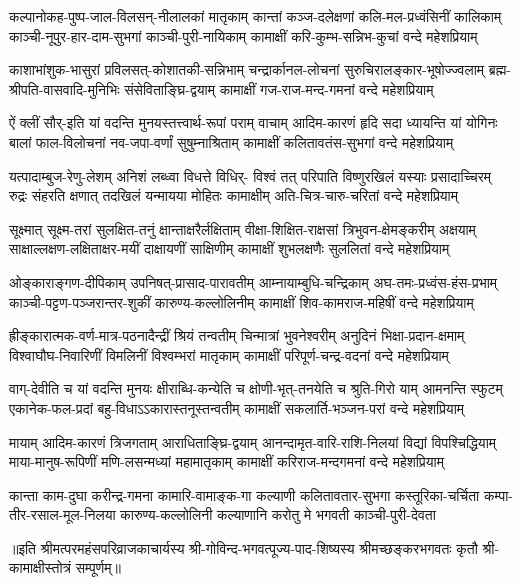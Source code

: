 
\setlength{\shlokaspaceskip}{16pt}
\fourlineindentedshloka
{कल्पानोकह-पुष्प-जाल-विलसन्-नीलालकां मातृकाम्}
{कान्तां कञ्ज-दलेक्षणां कलि-मल-प्रध्वंसिनीं कालिकाम्}
{काञ्ची-नूपुर-हार-दाम-सुभगां काञ्ची-पुरी-नायिकाम्}
{कामाक्षीं करि-कुम्भ-सन्निभ-कुचां वन्दे महेशप्रियाम्}%

\fourlineindentedshloka
{काशाभांशुक-भासुरां प्रविलसत्-कोशातकी-सन्निभाम्}
{चन्द्रार्कानल-लोचनां सुरुचिरालङ्कार-भूषोज्ज्वलाम्}
{ब्रह्म-श्रीपति-वासवादि-मुनिभिः संसेविताङ्घ्रि-द्वयाम्}
{कामाक्षीं गज-राज-मन्द-गमनां वन्दे महेशप्रियाम्}%

\fourlineindentedshloka
{ऐं क्लीं सौर्-इति यां वदन्ति मुनयस्तत्त्वार्थ-रूपां पराम्}
{वाचाम् आदिम-कारणं हृदि सदा ध्यायन्ति यां योगिनः}
{बालां फाल-विलोचनां नव-जपा-वर्णां सुषुम्नाश्रिताम्}
{कामाक्षीं कलितावतंस-सुभगां वन्दे महेशप्रियाम्}%

\fourlineindentedshloka
{यत्पादाम्बुज-रेणु-लेशम् अनिशं लब्ध्वा विधत्ते विधिर्-}
{विश्वं तत् परिपाति विष्णुरखिलं यस्याः प्रसादाच्चिरम्}
{रुद्रः संहरति क्षणात् तदखिलं यन्मायया मोहितः}
{कामाक्षीम् अति-चित्र-चारु-चरितां वन्दे महेशप्रियाम्}%

\fourlineindentedshloka
{सूक्ष्मात् सूक्ष्म-तरां सुलक्षित-तनुं क्षान्ताक्षरैर्लक्षिताम्}
{वीक्षा-शिक्षित-राक्षसां त्रिभुवन-क्षेमङ्करीम् अक्षयाम्}
{साक्षाल्लक्षण-लक्षिताक्षर-मयीं दाक्षायणीं साक्षिणीम्}
{कामाक्षीं शुभलक्षणैः सुललितां वन्दे महेशप्रियाम्}%

\fourlineindentedshloka
{ओङ्काराङ्गण-दीपिकाम् उपनिषत्-प्रासाद-पारावतीम्}
{आम्नायाम्बुधि-चन्द्रिकाम् अघ-तमः-प्रध्वंस-हंस-प्रभाम्}
{काञ्ची-पट्टण-पञ्जरान्तर-शुकीं कारुण्य-कल्लोलिनीम्}
{कामाक्षीं शिव-कामराज-महिषीं वन्दे महेशप्रियाम्}%

\fourlineindentedshloka
{ह्रीङ्कारात्मक-वर्ण-मात्र-पठनादैन्द्रीं श्रियं तन्वतीम्}
{चिन्मात्रां भुवनेश्वरीम् अनुदिनं भिक्षा-प्रदान-क्षमाम्}
{विश्वाघौघ-निवारिणीं विमलिनीं विश्वम्भरां मातृकाम्}
{कामाक्षीं परिपूर्ण-चन्द्र-वदनां वन्दे महेशप्रियाम्}%

\fourlineindentedshloka
{वाग्-देवीति च यां वदन्ति मुनयः क्षीराब्धि-कन्येति च}
{क्षोणी-भृत्-तनयेति च श्रुति-गिरो याम् आमनन्ति स्फुटम्}
{एकानेक-फल-प्रदां बहु-विधाऽऽकारास्तनूस्तन्वतीम्}
{कामाक्षीं सकलार्ति-भञ्जन-परां वन्दे महेशप्रियाम्}%

\fourlineindentedshloka
{मायाम् आदिम-कारणं त्रिजगताम् आराधिताङ्घ्रि-द्वयाम्}
{आनन्दामृत-वारि-राशि-निलयां विद्यां विपश्चिद्धियाम्}
{माया-मानुष-रूपिणीं मणि-लसन्मध्यां महामातृकाम्}
{कामाक्षीं करिराज-मन्दगमनां वन्दे महेशप्रियाम्}%

\fourlineindentedshloka
{कान्ता काम-दुघा करीन्द्र-गमना कामारि-वामाङ्क-गा}
{कल्याणी कलितावतार-सुभगा कस्तूरिका-चर्चिता}
{कम्पा-तीर-रसाल-मूल-निलया कारुण्य-कल्लोलिनी}
{कल्याणानि करोतु मे भगवती काञ्ची-पुरी-देवता}%

{॥इति श्रीमत्परमहंसपरिव्राजकाचार्यस्य श्री-गोविन्द-भगवत्पूज्य-पाद-शिष्यस्य
श्रीमच्छङ्करभगवतः कृतौ श्री-कामाक्षीस्तोत्रं सम्पूर्णम्॥}
\setlength{\shlokaspaceskip}{24pt}
